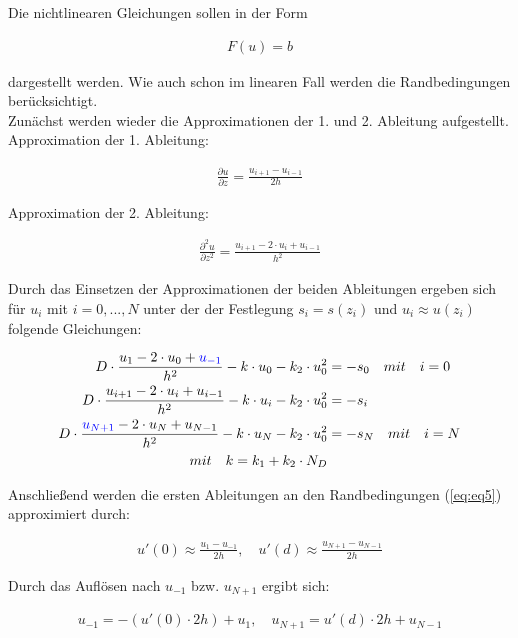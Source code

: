 \documentclass[
	pagesize,
	fontsize=12pt,
	paper=a4,
	oneside,
   reqno
]{scrartcl}
\begin{document}
Die nichtlinearen Gleichungen sollen in der Form

\begin{align}
   \label{eq:eq8}
   F(u) = b
\end{align}

dargestellt werden. Wie auch schon im linearen Fall werden die Randbedingungen berücksichtigt. \\

Zunächst werden wieder die Approximationen der 1. und 2. Ableitung aufgestellt. \\

Approximation der 1. Ableitung:

\begin{align*}
   \frac{\partial u}{\partial z} = \frac{u_{i+1}-u_{i-1}}{2h}
\end{align*}

Approximation der 2. Ableitung:

\begin{align*}
   \frac{\partial^2 u}{\partial z^2} = \frac{u_{i+1}-2\cdot u_i+u_{i-1}}{h^2}
\end{align*}

Durch das Einsetzen der Approximationen der beiden Ableitungen ergeben sich für $u_i$ mit $i=0, ... ,N$ unter der der Festlegung $s_i = s(z_i)$ und $u_i \approx u(z_i)$ folgende Gleichungen:

\begin{align*}
   D\cdot \frac{u_1-2\cdot u_0+\textcolor{blue}{u_{-1}}}{h^2} - k\cdot u_0 -k_2\cdot u_0^2 &= -s_0 \quad mit \quad i = 0 \\
   D\cdot \frac{u_{i+1}-2\cdot u_i+u_{i-1}}{h^2} - k\cdot u_i -k_2\cdot u_0^2 &= -s_i \\
   D\cdot \frac{\textcolor{blue}{u_{N+1}}-2\cdot u_N+u_{N-1}}{h^2} - k\cdot u_N -k_2\cdot u_0^2 &= -s_N \quad mit \quad i = N \\
   mit \quad k = k_1+k_2\cdot N_D
\end{align*}

Anschließend werden die ersten Ableitungen an den Randbedingungen (\autoref{eq:eq5}) approximiert durch:

\begin{align*}
   u'(0) \approx \frac{u_1-u_{-1}}{2h}, \quad u'(d) \approx \frac{u_{N+1}-u_{N-1}}{2h}
\end{align*}

Durch das Auflösen nach $u_{-1}$ bzw. $u_{N+1}$ ergibt sich:

\begin{align*}
   u_{-1} = -(u'(0)\cdot 2h) + u_1, \quad u_{N+1} = u'(d)\cdot 2h + u_{N-1}
\end{align*}
\end{document}
